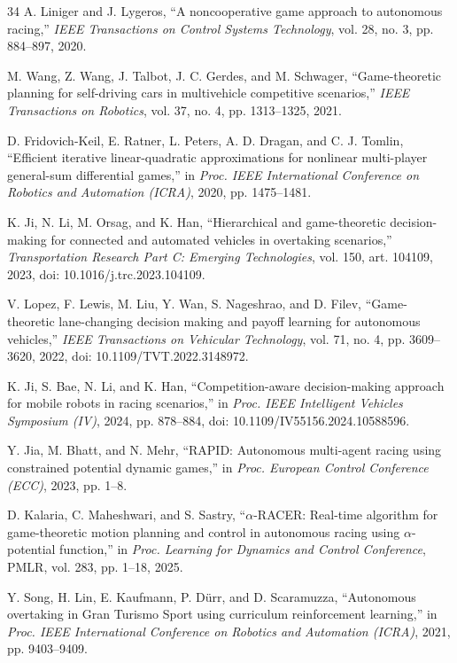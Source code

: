 \documentclass[journal,twoside,web]{ieeecolor}
\begin{document}
\begin{thebibliography}{34}
A. Liniger and J. Lygeros,
``A noncooperative game approach to autonomous racing,''
\emph{IEEE Transactions on Control Systems Technology}, vol. 28, no. 3,
pp. 884--897, 2020.

M. Wang, Z. Wang, J. Talbot, J. C. Gerdes, and M. Schwager,
``Game-theoretic planning for self-driving cars in multivehicle competitive
scenarios,'' \emph{IEEE Transactions on Robotics}, vol. 37, no. 4,
pp. 1313--1325, 2021.

D. Fridovich-Keil, E. Ratner, L. Peters, A. D. Dragan, and C. J. Tomlin,
``Efficient iterative linear-quadratic approximations for nonlinear
multi-player general-sum differential games,'' in \emph{Proc. IEEE
International Conference on Robotics and Automation (ICRA)}, 2020,
pp. 1475--1481.

K. Ji, N. Li, M. Orsag, and K. Han,
``Hierarchical and game-theoretic decision-making for connected and automated
vehicles in overtaking scenarios,'' \emph{Transportation Research Part C:
Emerging Technologies}, vol. 150, art. 104109, 2023,
doi: 10.1016/j.trc.2023.104109.

V. Lopez, F. Lewis, M. Liu, Y. Wan, S. Nageshrao, and D. Filev,
``Game-theoretic lane-changing decision making and payoff learning for
autonomous vehicles,'' \emph{IEEE Transactions on Vehicular Technology},
vol. 71, no. 4, pp. 3609--3620, 2022,
doi: 10.1109/TVT.2022.3148972.

K. Ji, S. Bae, N. Li, and K. Han,
``Competition-aware decision-making approach for mobile robots in racing
scenarios,'' in \emph{Proc. IEEE Intelligent Vehicles Symposium (IV)}, 2024,
pp. 878--884, doi: 10.1109/IV55156.2024.10588596.

Y. Jia, M. Bhatt, and N. Mehr,
``RAPID: Autonomous multi-agent racing using constrained potential dynamic
games,'' in \emph{Proc. European Control Conference (ECC)}, 2023, pp. 1--8.

D. Kalaria, C. Maheshwari, and S. Sastry,
``$\alpha$-RACER: Real-time algorithm for game-theoretic motion planning and
control in autonomous racing using $\alpha$-potential function,'' in
\emph{Proc. Learning for Dynamics and Control Conference}, PMLR, vol. 283,
pp. 1--18, 2025.

Y. Song, H. Lin, E. Kaufmann, P. D\"urr, and D. Scaramuzza,
``Autonomous overtaking in Gran Turismo Sport using curriculum reinforcement
learning,'' in \emph{Proc. IEEE International Conference on Robotics and
Automation (ICRA)}, 2021, pp. 9403--9409.


\end{thebibliography}
\end{document}
